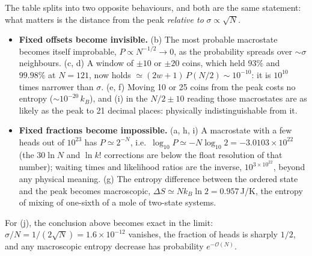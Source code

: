 The table splits into two opposite behaviours, and both are the same statement: what matters is the distance from the peak \emph{relative to} $\sigma\propto\sqrt N$.
\begin{itemize}
\item \textbf{Fixed offsets become invisible.} (b) The most probable macrostate becomes itself improbable, $P\propto N^{-1/2}\to0$, as the probability spreads over $\sim\sigma$ neighbours. (c, d) A window of $\pm10$ or $\pm20$ coins, which held $93\%$ and $99.98\%$ at $N=121$, now holds $\simeq(2w+1)\,P(N/2)\sim10^{-10}$: it is $10^{10}$ times narrower than $\sigma$. (e, f) Moving 10 or 25 coins from the peak costs no entropy ($\sim10^{-20}\,k_B$), and (i) in the $N/2\pm10$ reading those macrostates are as likely as the peak to 21 decimal places: physically indistinguishable from it.
\item \textbf{Fixed fractions become impossible.} (a, h, i) A macrostate with a few heads out of $10^{23}$ has $P\simeq2^{-N}$, i.e.\ $\log_{10}P\simeq-N\log_{10}2=-3.0103\times10^{22}$ (the $30\ln N$ and $\ln k!$ corrections are below the float resolution of that number); waiting times and likelihood ratios are the inverse, $10^{3\times10^{22}}$, beyond any physical meaning. (g) The entropy difference between the ordered state and the peak becomes macroscopic, $\Delta S\simeq Nk_B\ln2=0.957$\,J/K, the entropy of mixing of one-sixth of a mole of two-state systems.
\end{itemize}
For (j), the conclusion above becomes exact in the limit: $\sigma/N=1/(2\sqrt N)=1.6\times10^{-12}$ vanishes, the fraction of heads is sharply $1/2$, and any macroscopic entropy decrease has probability $e^{-\mathcal O(N)}$.
